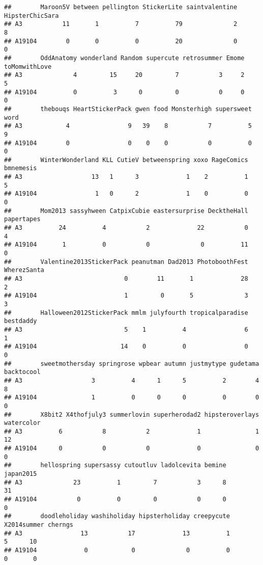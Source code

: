 \documentclass[
]{article}
\begin{document}
\begin{verbatim}
##        Maroon5V between pellington StickerLite saintvalentine HipsterChicSara
## A3           11       1          7          79              2               8
## A19104        0       0          0          20              0               0
##        OddAnatomy wonderland Random supercute retrosummer Emome toMomwithLove
## A3              4         15     20         7           3     2             5
## A19104          0          3      0         0           0     0             0
##        thebouqs HeartStickerPack gwen food Monsterhigh supersweet word
## A3            4                9   39    8           7          5    9
## A19104        0                0    0    0           0          0    0
##        WinterWonderland KLL CutieV betweenspring xoxo RageComics bmnemesis
## A3                   13   1      3             1    2          1         5
## A19104                1   0      2             1    0          0         0
##        Mom2013 sassyhween CatpixCubie eastersurprise DecktheHall papertapes
## A3          24          4           2             22           0          4
## A19104       1          0           0              0          11          0
##        Valentine2013StickerPack peanutman Dad2013 PhotoboothFest WherezSanta
## A3                            0        11       1             28           2
## A19104                        1         0       5              3           3
##        Halloween2012StickerPack mmlm julyfourth tropicalparadise bestdaddy
## A3                            5    1          4                6         1
## A19104                       14    0          0                0         0
##        sweetmothersday springrose wpbear autumn justmytype gudetama backtocool
## A3                   3          4      1      5          2        4          8
## A19104               1          0      0      0          0        0          0
##        X8bit2 X4thofjuly3 summerlovin superherodad2 hipsteroverlays watercolor
## A3          6           8           2             1               1         12
## A19104      0           0           0             0               0          0
##        hellospring supersassy cutoutluv ladolcevita bemine japan2015
## A3              23          1         7           3      8        31
## A19104           0          0         0           0      0         0
##        doodleholiday washiholiday hipsterholiday creepycute X2014summer cherngs
## A3                13           17             13          1           5      10
## A19104             0            0              0          0           0       0

\end{verbatim}
\end{document}
